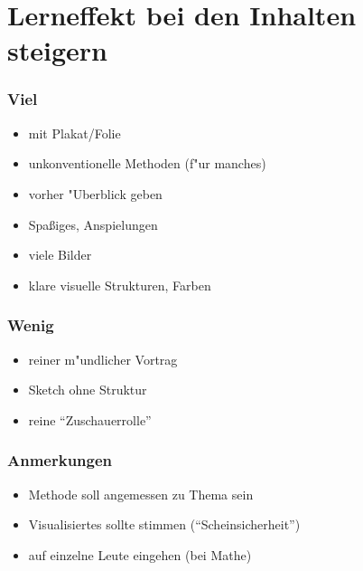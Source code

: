 \section{Lerneffekt bei den Inhalten steigern}

\subsubsection{Viel}
\begin{itemize}
\item mit Plakat/Folie
\item unkonventionelle Methoden (f"ur manches)
\item vorher "Uberblick geben
\item Spaßiges, Anspielungen
\item viele Bilder
\item klare visuelle Strukturen, Farben
\end{itemize}

\subsubsection{Wenig}
\begin{itemize}
\item reiner m"undlicher Vortrag
\item Sketch ohne Struktur
\item reine "`Zuschauerrolle"'
\end{itemize}

\subsubsection{Anmerkungen}
\begin{itemize}
\item Methode soll angemessen zu Thema sein
\item Visualisiertes sollte stimmen ("`Scheinsicherheit"')
\item auf einzelne Leute eingehen (bei Mathe)
\end{itemize}
